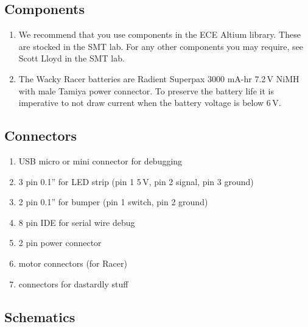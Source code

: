 \documentclass[11pt, a4paper]{article}
\begin{document}
\subsection{Components}

\begin{enumerate}
\item We recommend that you use components in the ECE Altium library.
  These are stocked in the SMT lab.  For any other components you may
  require, see Scott Lloyd in the SMT lab.

\item The Wacky Racer batteries are Radient Superpax 3000 mA-hr 7.2\,V
  NiMH with male Tamiya power connector.  To preserve the battery life
  it is imperative to not draw current when the battery voltage is
  below 6\,V.
\end{enumerate}


\subsection{Connectors}

\begin{enumerate}
\item USB micro or mini connector for debugging
\item 3 pin 0.1'' for LED strip (pin 1 5\,V, pin 2 signal, pin 3 ground)
\item 2 pin 0.1'' for bumper (pin 1 switch, pin 2 ground)
\item 8 pin IDE for serial wire debug  
\item 2 pin power connector
\item motor connectors (for Racer)
\item connectors for dastardly stuff
\end{enumerate}


\subsection{Schematics}
\end{document}
